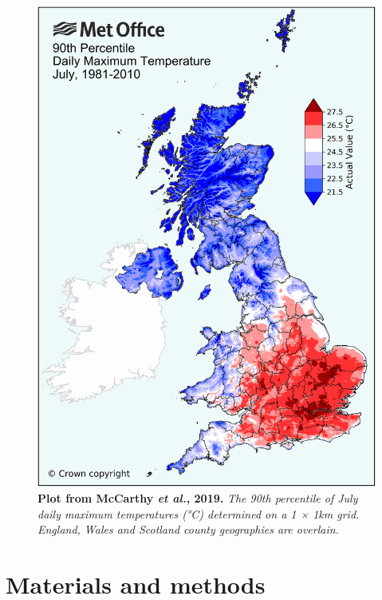 \documentclass[10pt,letterpaper]{article}
\begin{document}
\begin{figure}
    \begin{center}
        \includegraphics[width=\linewidth]{./mccarthy2019-fig3.jpg}
    \end{center}
    \caption{
    {\bf Plot from McCarthy \textit{et al.}, 2019.}
    \textit{The 90th percentile of July daily maximum temperatures (°C) determined on a 1 × 1km grid. England, Wales and Scotland county geographies are overlain.}\cite{McCarthy2019}
    }
    \label{McCarthy-fig3}
\end{figure}


\pagebreak

\section*{Materials and methods}
\end{document}
